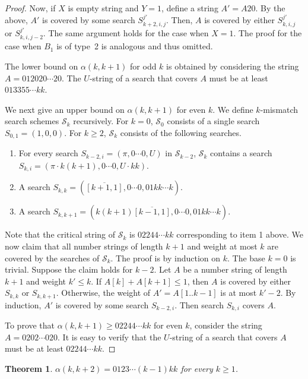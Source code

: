 \documentclass[12pt]{article}
\newtheorem{theorem}{Theorem}
\newcommand{\substr}[3]{#1[#2..#3]}
\newcommand{\scheme}{\mathcal{S}}
\newcommand{\seq}[2]{[#1,#2]}
\newcommand{\seqr}[2]{\overline{[#1,#2]}}
\newif\iffull
\begin{document}
\begin{proof}
Now, if $X$ is empty string and $Y=1$, define a string $A'=A20$.
By the above, $A'$ is covered by some search $S_{k+2,i,j}^{j'}$.
Then, $A$ is covered by either $S_{k,i,j}^{j'}$ or $S_{k,i,j-2}^{j'}$.
The same argument holds for the case when $X=1$.
The proof for the case when $B_1$ is of type~2 is analogous and thus omitted.

The lower bound on $\alpha(k,k+1)$ for odd $k$ is obtained by considering
the string $A=012020\cdots 20$. The $U$-string of a search that covers $A$
must be at least $013355\cdots kk$.

We next give an upper bound on $\alpha(k,k+1)$ for even $k$.
We define $k$-mismatch search schemes $\scheme_k$ recursively.
For $k=0$, $\scheme_0$ consists of a single search $S_{0,1}=(1,0,0)$.
For $k\geq 2$, $\scheme_k$ consists of the following searches.
\begin{enumerate}
\item For every search $S_{k-2,i}=(\pi,0\cdots 0,U)$ in $\scheme_{k-2}$,
$\scheme_k$ contains a search
$S_{k,i}=(\pi\cdot k(k+1), 0\cdots 0, U\cdot kk)$.
\item A search
$S_{k,k} = (\seqr{k+1}{1}, 0\cdots 0, 01kk\cdots k)$.
\item A search
$S_{k,k+1} = (k(k+1)\seqr{k-1}{1}, 0\cdots 0, 01kk\cdots k)$.
\end{enumerate}
Note that the critical string of $\scheme_k$ is $02244\cdots kk$
corresponding to item 1 above.
We now claim that all number strings of length $k+1$ and weight at most $k$
are covered by the searches of $\scheme_k$.
The proof is by induction on $k$.
The base $k=0$ is trivial.
Suppose the claim holds for $k-2$.
Let $A$ be a number string of length $k+1$ and weight $k'\leq k$.
If $A[k]+A[k+1]\leq 1$, then $A$ is covered by either $S_{k,k}$ or $S_{k,k+1}$.
Otherwise, the weight of $A' = \substr{A}{1}{k-1}$ is at most
$k'-2$.
By induction,
$A'$ is covered by some search
$S_{k-2,i}$. Then search $S_{k,i}$ covers $A$.

To prove that $\alpha(k,k+1) \geq 02244\cdots kk$ for even $k$,
consider the string $A=0202\cdots 020$.
It is easy to verify that the $U$-string of a search that covers $A$
must be at least $02244\cdots kk$.
\end{proof}
\fi
\begin{theorem}\label{thm:alpha2}
$\alpha(k,k+2) = 0123\cdots (k-1)kk$ for every $k\geq 1$.
\label{theorem2}
\end{theorem}
\iffull
\begin{proof}
We first give an upper bound on $\alpha(k,k+1)$.
We build a $k$-mismatch search scheme $\scheme$ that contains
searches
$S_{k,i,j} = (\seq{i}{k+2}\seqr{i-1}{1},0\cdots 0,\seq{0}{j}jk\cdots k)$
for all $i$ and $j$.
Let $A$ be a string of weight $k$ and length $k+2$.
By Lemma~\ref{lem:simple} there are indices $i$ and $j$ such that
$\substr{A}{i}{i+j+1}=01^j0$, and therefore $A$ is covered by
$S_{k,i,j}$.

The lower bound is obtained from the string $A=011\cdots 110$.
It is easy to verify that the $U$-string of a search that covers $A$
must be at least $0123\cdots (k-1)kk$.
\end{proof}
\fi
\end{document}
